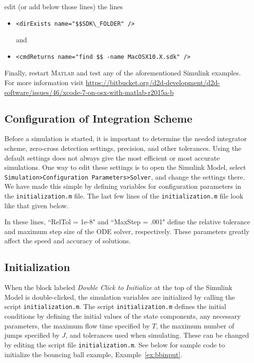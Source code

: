 \documentclass{article}
\newcommand{\matlab}{\textsc{Matlab}}
\begin{document}
\begin{itemize}
edit (or add below those lines) the lines
\begin{itemize}
\item
\begin{verbatim}
<dirExists name="$$SDK\_FOLDER" />
\end{verbatim}
and
\item
\begin{verbatim}
<cmdReturns name="find $$ -name MacOSX10.X.sdk" />
\end{verbatim}
\end{itemize}

Finally, restart \matlab{} and test any of the aforementioned Simulink examples.
For more information visit 
{\footnotesize\url{https://bitbucket.org/d2d-development/d2d-software/issues/46/xcode-7-on-osx-with-matlab-r2015a-b}}
\end{itemize}


\subsection{Configuration of Integration Scheme}
Before a simulation is started, it is important to determine the needed integrator scheme, 
zero-cross detection settings, precision, and other tolerances. 
Using the default settings does not always give the most 
efficient or most accurate simulations. 
One way to edit these settings is to open the Simulink Model, 
select {\tt Simulation>Configuration Parameters>Solver}, 
and change the settings there. We have made this simple by defining variables 
for configuration parameters in the {\tt initialization.m} file. 
The last few lines of the {\tt initialization.m} file look like that given below.\\

% 
\label{scr:config_inst}

In these lines, ``RelTol = 1e-8" and ``MaxStep = .001" define the relative tolerance 
and maximum step size of the ODE solver, respectively. 
These parameters greatly affect the speed and accuracy of solutions.

\subsection{Initialization}

When the block labeled {\em Double Click to Initialize} at the top of the 
Simulink Model is double-clicked, the simulation variables are initialized 
by calling the script {\tt initialization.m}. 
The script {\tt initialization.m} defines the initial conditions by defining 
the initial values of the state components, any necessary parameters, 
the maximum flow time specified by $T$, the maximum number of jumps specified by $J$, 
and tolerances used when simulating. 
These can be changed by editing the script file {\tt initialization.m}. 
See below for sample code to initialize the bouncing ball example, 
Example~\ref{ex:bbinput}.\\
\end{document}
